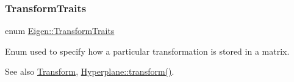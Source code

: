 \mbox{\label{group__enums_gaee59a86102f150923b0cac6d4ff05107}} 
\subsubsection{\texorpdfstring{Transform\+Traits}{TransformTraits}\hspace{0.1cm}{\footnotesize\ttfamily [2/2]}}
{\footnotesize\ttfamily enum \hyperlink{group__enums_gaee59a86102f150923b0cac6d4ff05107}{Eigen\+::\+Transform\+Traits}}

Enum used to specify how a particular transformation is stored in a matrix. \begin{DoxySeeAlso}{See also}
\hyperlink{group___geometry___module_class_eigen_1_1_transform}{Transform}, \hyperlink{group___geometry___module_a44d7ad009a496f78636ce69f611f2003}{Hyperplane\+::transform()}. 
\end{DoxySeeAlso}
